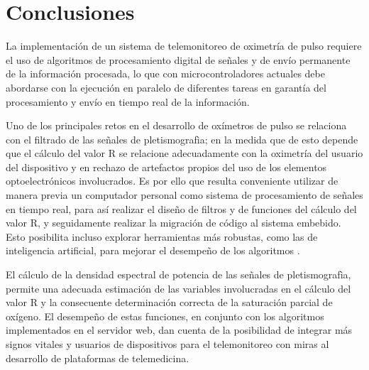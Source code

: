 \documentclass[journal]{IEEEtran}
\begin{document}
%		
%			
%	
%			




\section{Conclusiones}


La implementación de un sistema de telemonitoreo de oximetría de pulso requiere el uso de algoritmos de procesamiento digital de señales y de envío permanente de la información procesada, lo que con microcontroladores actuales debe abordarse con la ejecución en paralelo de diferentes tareas en garantía del procesamiento y envío en tiempo real de la información.


Uno de los principales retos en el desarrollo de oxímetros de pulso se relaciona con el filtrado de las señales de pletismografìa; en la medida que de esto depende que el cálculo del valor R se relacione adecuadamente con la oximetría del usuario del dispositivo y en rechazo de artefactos propios del uso de los elementos optoelectrónicos involucrados. Es por ello que resulta conveniente utilizar de manera previa un computador personal como sistema de procesamiento de señales en tiempo real, para así realizar el diseño de filtros y de funciones del cálculo del valor R, y seguidamente realizar la migración de código al sistema embebido. Esto posibilita incluso explorar herramientas más robustas, como las de inteligencia artificial, para mejorar el desempeño de los algoritmos \cite{E_spo2_wrist_machine_learning}.

El cálculo de la densidad espectral de potencia de las señales de pletismografìa, permite una adecuada estimación de las variables involucradas en el cálculo del valor R y la consecuente determinación correcta de la saturación parcial de oxígeno. El desempeño de estas funciones, en conjunto con los algoritmos implementados en el servidor web, dan cuenta de la posibilidad de integrar más signos vitales y usuarios de dispositivos para el telemonitoreo con miras al desarrollo de plataformas de telemedicina.




 








\end{document}
